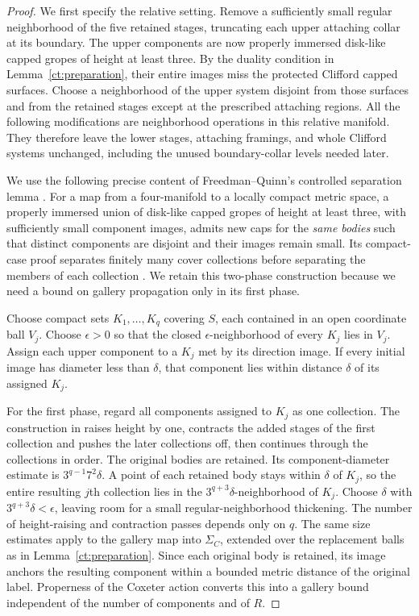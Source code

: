 \begin{proof}
We first specify the relative setting. Remove a sufficiently small
regular neighborhood of the five retained stages, truncating each upper
attaching collar at its boundary. The upper components are now properly
immersed disk-like capped gropes of height at least three. By the duality
condition in Lemma~\ref{ct:preparation}, their entire images miss the
protected Clifford capped surfaces. Choose a neighborhood of the upper
system disjoint from those surfaces and from the retained stages except
at the prescribed attaching regions. All the following modifications
are neighborhood operations in this relative manifold. They therefore
leave the lower stages, attaching framings, and whole Clifford systems
unchanged, including the unused boundary-collar levels needed later.

We use the following precise content of Freedman--Quinn's controlled
separation lemma \cite[Lemma~2.10.1]{FQ}. For a map from a four-manifold
to a locally compact metric space, a properly immersed union of
disk-like capped gropes of height at least three, with sufficiently
small component images, admits new caps for the \emph{same bodies}
such that distinct components are disjoint and their images remain
small. Its compact-case proof separates finitely many cover collections
before separating the members of each collection
\cite[Section~2.10.2]{FQ}. We retain this two-phase construction because
we need a bound on gallery propagation only in its first phase.

Choose compact sets $K_1,\ldots,K_q$ covering $S$, each contained in an
open coordinate ball $V_j$. Choose $\epsilon>0$ so that the closed
$\epsilon$-neighborhood of every $K_j$ lies in $V_j$. Assign each upper
component to a $K_j$ met by its direction image. If every initial image
has diameter less than $\delta$, that component lies within distance
$\delta$ of its assigned $K_j$.

For the first phase, regard all components assigned to $K_j$ as one
collection. The construction in \cite[Section~2.10.2]{FQ} raises height
by one, contracts the added stages of the first collection and pushes
the later collections off, then continues through the collections in
order. The original bodies are retained. Its component-diameter estimate is
$3^{q-1}7^2\delta$. A point of each retained body stays within
$\delta$ of $K_j$, so the entire resulting $j$th collection lies in
the $3^{q+3}\delta$-neighborhood of $K_j$. Choose $\delta$ with
$3^{q+3}\delta<\epsilon$, leaving room for a small regular-neighborhood
thickening. The number of height-raising and contraction passes depends
only on $q$. The same size estimates apply to the gallery map into
$\Sigma_C$, extended over the replacement balls as in
Lemma~\ref{ct:preparation}. Since each original body is retained, its
image anchors the resulting component within a bounded metric distance
of the original label. Properness of the Coxeter action converts this
into a gallery bound independent of the number of components and of $R$.


\end{proof}
